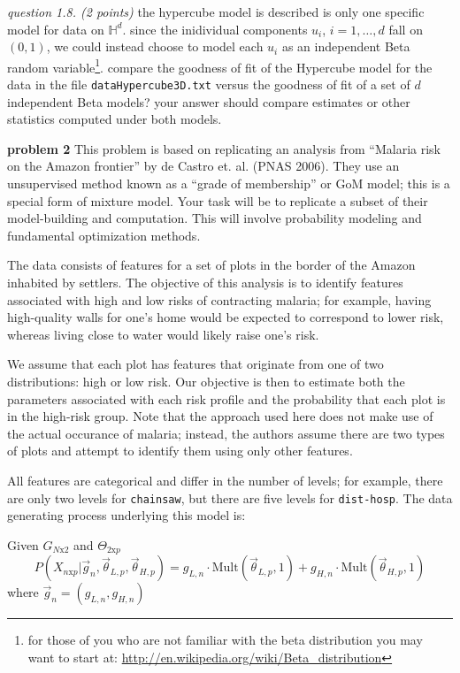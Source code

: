 \documentclass[11pt]{article}
\begin{document}
{\em question 1.8. (2 points)} the hypercube model is described is only one specific model for data on $\mathbb{H}^d$. since the inidividual components $u_i$, $i=1,\ldots,d$ fall on $(0,1)$, we could instead choose to model each $u_i$ as an independent Beta random variable\footnote{for those of you who are not familiar with the beta distribution you may want to start at: \url{http://en.wikipedia.org/wiki/Beta_distribution}}. compare the goodness of fit of the Hypercube model for the data in the file {\tt dataHypercube3D.txt} versus the goodness of fit of a set of $d$ independent Beta models? your answer should compare estimates or other statistics computed under both models. 

\clearpage

\textbf{problem 2}
This problem is based on replicating an analysis from ``Malaria risk on the Amazon frontier'' by de Castro et. al. (PNAS 2006). They use an unsupervised method known as a ``grade of membership'' or GoM model; this is a special form of mixture model. Your task will be to replicate a subset of their model-building and computation. This will involve probability modeling and fundamental optimization methods.

The data consists of features for a set of plots in the border of the Amazon inhabited by settlers. The objective of this analysis is to identify features associated with high and low risks of contracting malaria; for example, having high-quality walls for one's home would be expected to correspond to lower risk, whereas living close to water would likely raise one's risk.

We assume that each plot has features that originate from one of two distributions: high or low risk. Our objective is then to estimate both the parameters associated with each risk profile and the probability that each plot is in the high-risk group. Note that the approach used here does not make use of the actual occurance of malaria; instead, the authors assume there are two types of plots and attempt to identify them using only other features.

All features are categorical and differ in the number of levels; for example, there are only two levels for \texttt{chainsaw}, but there are five levels for \texttt{dist-hosp}. The data generating process underlying this model is:

\begin{algorithm}
\begin{algorithmic}
\STATE Given \(G_{N\text{x}2}\) and \(\Theta_{2\text{x}p}\)
\STATE $$P(X_{n\text{x}p}|\overrightarrow{g}_{n},\overrightarrow{\theta}_{L,p},\overrightarrow{\theta}_{H,p})=g_{L,n}\cdot \text{Mult}(\overrightarrow{\theta}_{L,p},1) + g_{H,n} \cdot \text{Mult}(\overrightarrow{\theta}_{H,p},1)$$
\STATE where \(\overrightarrow{g}_{n}=(g_{L,n},g_{H,n})\)
\ENDFOR
\ENDFOR
\end{algorithmic}
\end{algorithm}
\end{document}
